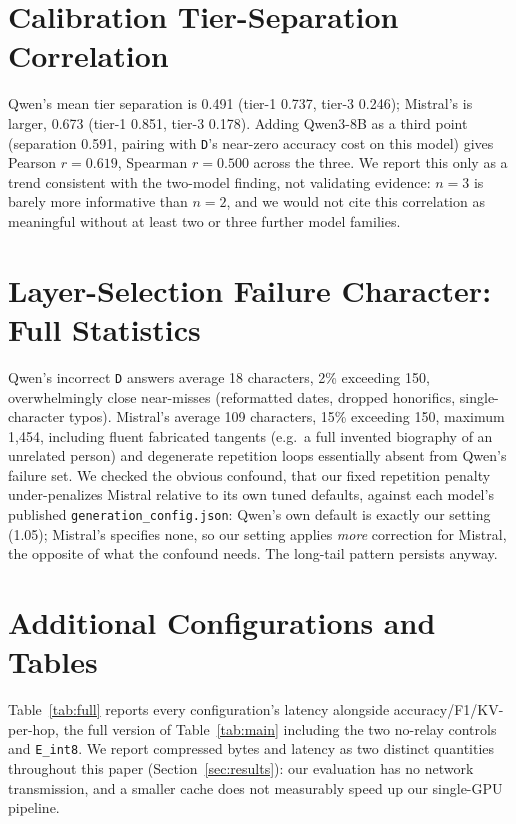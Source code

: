\documentclass[11pt]{article}
\begin{document}
\section{Calibration Tier-Separation Correlation}
\label{app:calibration}

Qwen's mean tier separation is 0.491 (tier-1 0.737, tier-3 0.246);
Mistral's is larger, 0.673 (tier-1 0.851, tier-3 0.178). Adding
Qwen3-8B as a third point (separation 0.591, pairing with \texttt{D}'s
near-zero accuracy cost on this model) gives Pearson $r=0.619$, Spearman
$r=0.500$ across the three. We report this only as a trend consistent
with the two-model finding, not validating evidence: $n=3$ is barely
more informative than $n=2$, and we would not cite this correlation as
meaningful without at least two or three further model families.

\section{Layer-Selection Failure Character: Full Statistics}
\label{app:failurechar}

Qwen's incorrect \texttt{D} answers average 18 characters, 2\%
exceeding 150, overwhelmingly close near-misses (reformatted dates,
dropped honorifics, single-character typos). Mistral's average 109
characters, 15\% exceeding 150, maximum 1,454, including fluent
fabricated tangents (e.g.\ a full invented biography of an unrelated
person) and degenerate repetition loops essentially absent from Qwen's
failure set. We checked the obvious confound, that our fixed
repetition penalty under-penalizes Mistral relative to its own tuned
defaults, against each model's published \texttt{generation\_config.json}:
Qwen's own default is exactly our setting (1.05); Mistral's specifies
none, so our setting applies \emph{more} correction for Mistral, the
opposite of what the confound needs. The long-tail pattern persists
anyway.

\section{Additional Configurations and Tables}
\label{app:extratables}

Table~\ref{tab:full} reports every configuration's latency alongside
accuracy/F1/KV-per-hop, the full version of Table~\ref{tab:main}
including the two no-relay controls and \texttt{E\_int8}. We report
compressed bytes and latency as two distinct quantities throughout this
paper (Section~\ref{sec:results}): our evaluation has no network
transmission, and a smaller cache does not measurably speed up our
single-GPU pipeline.
\end{document}

